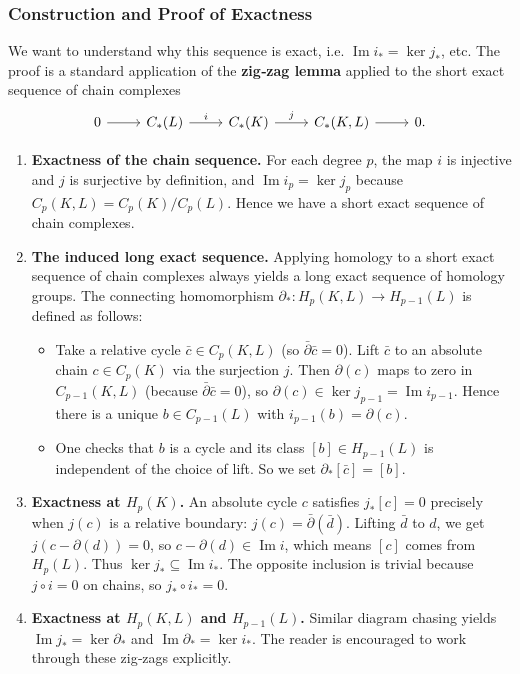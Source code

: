 \documentclass{article}
\theoremstyle{definition}
\begin{document}
\subsubsection*{Construction and Proof of Exactness}
We want to understand why this sequence is exact, i.e. $\operatorname{Im} i_* = \ker j_*$, etc.
The proof is a standard application of the \textbf{zig‑zag lemma} applied to the short exact sequence of chain complexes
\[
\begin{tikzcd}
0 \arrow[r] & C_*(L) \arrow[r, "i"] & C_*(K) \arrow[r, "j"] & C_*(K,L) \arrow[r] & 0.
\end{tikzcd}
\]

\begin{enumerate}
    \item \textbf{Exactness of the chain sequence.}
    For each degree $p$, the map $i$ is injective and $j$ is surjective by definition, and $\operatorname{Im} i_p = \ker j_p$ because $C_p(K,L) = C_p(K)/C_p(L)$. Hence we have a short exact sequence of chain complexes.
    
    \item \textbf{The induced long exact sequence.}
    Applying homology to a short exact sequence of chain complexes always yields a long exact sequence of homology groups. The connecting homomorphism $\partial_* : H_p(K,L) \to H_{p-1}(L)$ is defined as follows:
    \begin{itemize}
        \item Take a relative cycle $\bar{c} \in C_p(K,L)$ (so $\bar{\partial} \bar{c}=0$). Lift $\bar{c}$ to an absolute chain $c \in C_p(K)$ via the surjection $j$. Then $\partial(c)$ maps to zero in $C_{p-1}(K,L)$ (because $\bar{\partial}\bar{c}=0$), so $\partial(c) \in \ker j_{p-1} = \operatorname{Im} i_{p-1}$. Hence there is a unique $b \in C_{p-1}(L)$ with $i_{p-1}(b)=\partial(c)$.
        \item One checks that $b$ is a cycle and its class $[b] \in H_{p-1}(L)$ is independent of the choice of lift. So we set $\partial_*[\bar{c}] = [b]$.
    \end{itemize}

    \item \textbf{Exactness at $H_p(K)$.}
    An absolute cycle $c$ satisfies $j_*[c]=0$ precisely when $j(c)$ is a relative boundary: $j(c) = \bar{\partial}(\bar{d})$. Lifting $\bar{d}$ to $d$, we get $j(c - \partial(d)) = 0$, so $c - \partial(d) \in \operatorname{Im} i$, which means $[c]$ comes from $H_p(L)$. Thus $\ker j_* \subseteq \operatorname{Im} i_*$. The opposite inclusion is trivial because $j\circ i =0$ on chains, so $j_*\circ i_* = 0$.
    
    \item \textbf{Exactness at $H_p(K,L)$ and $H_{p-1}(L)$.}
    Similar diagram chasing yields $\operatorname{Im} j_* = \ker \partial_*$ and $\operatorname{Im} \partial_* = \ker i_*$. The reader is encouraged to work through these zig‑zags explicitly.
\end{enumerate}
\end{document}
